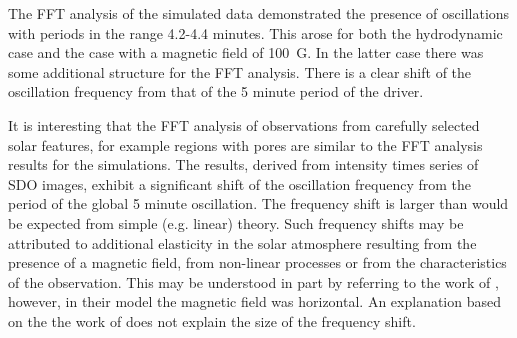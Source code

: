 \documentclass[physics,article,submit,pdftex,moreauthors]{Definitions/mdpi}
\begin{document}
The FFT analysis of the simulated data demonstrated the presence of oscillations with periods in the range 4.2-4.4 minutes. This arose for both the hydrodynamic case and the case with a magnetic field of 100~G. In  the latter case there was some additional structure for the FFT analysis. There is a clear shift of the oscillation frequency from that of the 5 minute period of the driver. 

It is interesting that the FFT analysis  of observations from carefully selected solar features, for example regions with pores are similar to the FFT analysis results for the simulations. The results, derived from intensity times series of SDO images, exhibit a significant shift of the oscillation frequency from the period of the global 5 minute oscillation.  The frequency shift is larger than would be expected from  simple (e.g. linear) theory. Such frequency shifts may be attributed to additional elasticity in the solar atmosphere resulting from the presence of a magnetic field, from non-linear processes or from the characteristics of the observation. This  may be understood in part by referring to the work of \cite{Campbell1989} , however, in their model the magnetic field was horizontal. An explanation based on the the work of \cite{Hindman1996} does not explain the size of the frequency shift.

 
  
  

 
 
\end{document}

